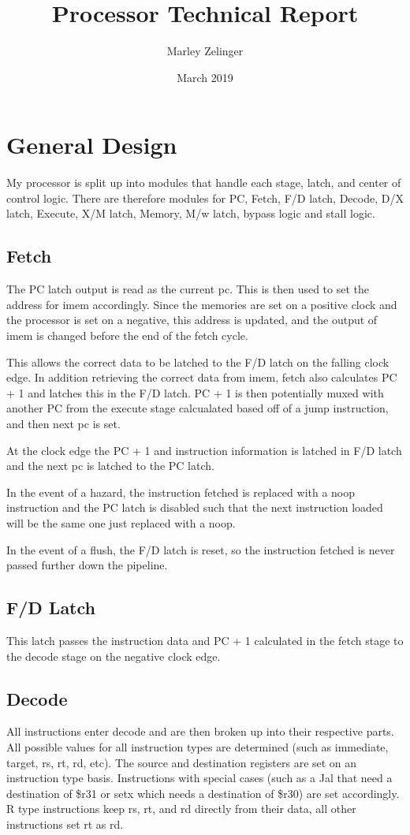 \documentclass{article}
\title{Processor Technical Report}
\author{Marley Zelinger}
\date{March 2019}
\begin{document}
\section{General Design}
My processor is split up into modules that handle each stage, latch, and center of control logic. There are therefore modules for PC, Fetch, F/D latch, Decode, D/X latch, Execute, X/M latch, Memory, M/w latch, bypass logic and stall logic. 

\subsection{Fetch}
The PC latch output is read as the current pc. This is then used to set the address for imem accordingly. Since the memories are set on a positive clock and the processor is set on a negative, this address is updated, and the output of imem is changed before the end of the fetch cycle. 

This allows the correct data to be latched to the F/D latch on the falling clock edge. In addition retrieving the correct data from imem, fetch also calculates PC + 1 and latches this in the F/D latch. PC + 1 is then potentially muxed with another PC from the execute stage calcualated based off of a jump instruction, and then next pc is set. 

At the clock edge the PC + 1 and instruction information is latched in F/D latch and the next pc is latched to the PC latch.

In the event of a hazard, the instruction fetched is replaced with a noop instruction and the PC latch is disabled such that the next instruction loaded will be the same one just replaced with a noop. 

In the event of a flush, the F/D latch is reset, so the instruction fetched is never passed further down the pipeline. 

\subsection{F/D Latch}

This latch passes the instruction data and PC + 1 calculated in the fetch stage to the decode stage on the negative clock edge.

\subsection{Decode}
All instructions enter decode and are then broken up into their respective parts. All possible values for all instruction types are determined (such as immediate, target, rs, rt, rd, etc). The source and destination registers are set on an instruction type basis. Instructions with special cases (such as a Jal that need a destination of \$r31 or setx which needs a destination of \$r30) are set accordingly. R type instructions keep rs, rt, and rd directly from their data, all other instructions set rt as rd. 
\end{document}
